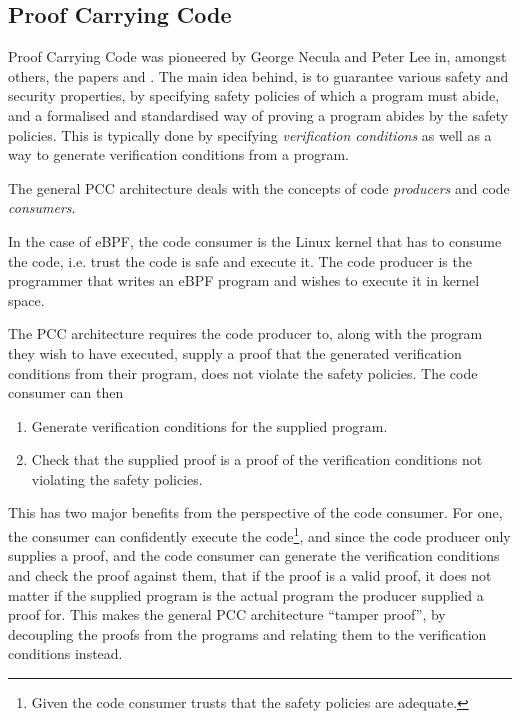 \subsection{Proof Carrying Code}
\label{subsec:proof_carrying_code}

Proof Carrying Code was pioneered by George Necula and Peter Lee in, amongst others, the papers \cite{kernel-ext-necula} and \cite{pcc-necula}. 
The main idea behind, is to guarantee various safety and security properties, by specifying safety policies of which a program must abide, and a formalised and standardised way of proving a program abides by the safety policies. This is typically done by specifying \textit{verification conditions} as well as a way to generate verification conditions from a program.

The general PCC architecture deals with the concepts of code \textit{producers} and code \textit{consumers}.

In the case of eBPF, the code consumer is the Linux kernel that has to consume the code, i.e. trust the code is safe and execute it. The code producer is the programmer that writes an eBPF program and wishes to execute it in kernel space.

The PCC architecture requires the code producer to, along with the program they wish to have executed, supply a proof that the generated verification conditions from their program, does not violate the safety policies.
The code consumer can then
\begin{enumerate}
\item Generate verification conditions for the supplied program.
  \item Check that the supplied proof is a proof of the verification conditions not violating the safety policies. 
\end{enumerate}

This has two major benefits from the perspective of the code consumer. For one, the consumer can confidently execute the code\footnote{Given the code consumer trusts that the safety policies are adequate.}, and since the code producer only supplies a proof, and the code consumer can generate the verification conditions and check the proof against them, that if the proof is a valid proof, it does not matter if the supplied program is the actual program the producer supplied a proof for. This makes the general PCC architecture ``tamper proof'', by decoupling the proofs from the programs and relating them to the verification conditions instead.  

